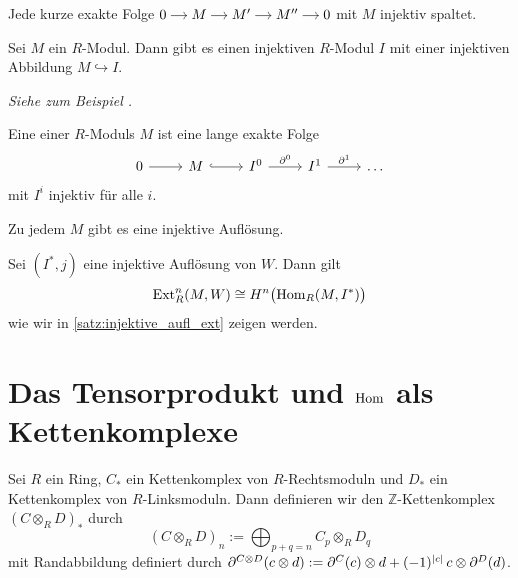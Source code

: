 \begin{bemerkung}[{name=[{kurze exakte mit injektivem Modul an der ersten Stelle}]}]
	Jede kurze exakte Folge \(
		\begin{tikzcd}[cramped,sep=small]
			0 \rar & M \rar & M' \rar & M'' \rar & 0
		\end{tikzcd}
	\)
	mit $M$ injektiv spaltet.
\end{bemerkung}

\begin{satz}[{name=[Existenz von injektiven Moduln]}]
	Sei $M$ ein $R$-Modul.
	Dann gibt es einen injektiven $R$-Modul $I$ mit einer injektiven Abbildung $M \hookrightarrow I$.
\end{satz}
\begin{beweis}
	\emph{Siehe zum Beispiel \cite[Satz~5.5.3]{Kasch}.}
\end{beweis}

\begin{definition}[{name=[{injektive Auflösung}]}]
	Eine  einer $R$-Moduls $M$ ist eine lange exakte Folge 
	\[
		\begin{tikzcd}
			0 \rar & M \rar[hook] & I^0 \rar["\partial^0"] & I^1 \rar["\partial^1"] & \ldots 
		\end{tikzcd}
	\]
	mit $I^i$ injektiv für alle $i$.
\end{definition}

\begin{korollarB}[{name=[{Existenz von injektiven Auflösungen}]}]
	Zu jedem $M$ gibt es eine injektive Auflösung.
\end{korollarB}

\begin{bemerkung}[{name=[{Ext mittels injektiver Auflösung}]}]
	Sei $(I^*,j)$ eine injektive Auflösung von $W$. 
	Dann gilt
	\[
		\Ext_R^n(M,W) \cong H^n \enbrace[\big]{\Hom_R(M,I^*)}
	\]
	wie wir in \autoref{satz:injektive_aufl_ext} zeigen werden.
\end{bemerkung}
\newpage

\section[Das Tensorprodukt und Hom als Kettenkomplexe]{Das Tensorprodukt und $\Hom$ als Kettenkomplexe} %
\label{sec:13}

\begin{definition}[{name=[{Tensorprodukt von Kettenkomplexen}]}]
	Sei $R$ ein Ring, $C_*$ ein Kettenkomplex von $R$-Rechtsmoduln und $D_*$ ein Kettenkomplex von $R$-Linksmoduln.
	Dann definieren wir den $\mathbb{Z}$-Kettenkomplex $(C \otimes_R D)_*$ durch 
	\[
		(C \otimes_R D)_n := \bigoplus_{p+q=n} C_p \otimes_R D_q
	\]
	mit Randabbildung definiert durch
	\(
		\partial^{C \otimes D} (c \otimes d) := \partial^C(c) \otimes d + (-1)^{\abs*{c}}\, c \otimes \partial^D(d)
	\).
\end{definition}

